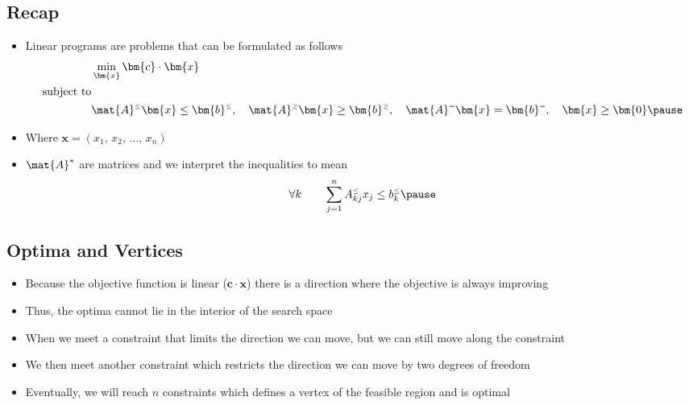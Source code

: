 \begin{slide}
\section{Recap}

\begin{PauseHighLight}
  \begin{itemize}
  \item Linear programs are problems that can be formulated as follows
    \begin{align*}
      &\min_{\bm{x}} \bm{c}\cdot \bm{x} \\
      \text{subject to}&\\
      &\mat{A}^{\scriptscriptstyle \leq} \bm{x} \leq
      \bm{b}^{\scriptscriptstyle \leq},  \quad
      \mat{A}^{\scriptscriptstyle \geq} 
      \bm{x} \geq \bm{b}^{\scriptscriptstyle \geq}, \quad 
      \mat{A}^{\scriptscriptstyle =} \bm{x} = \bm{b}^{\scriptscriptstyle
        =}, \quad \bm{x} \geq \bm{0}\pause 
    \end{align*}
  \item Where $\bm{x} = (x_1,\,x_2,\,\ldots,\,x_n)$\pause
  \item $\mat{A}^{*}$ are matrices and we interpret the inequalities to
    mean
    \begin{align*}
      \forall k \quad\quad \sum_{j=1}^n A_{kj}^{\scriptscriptstyle \leq}
      x_j \leq  b^{\scriptscriptstyle \leq}_k\pause
    \end{align*}
  \end{itemize}
\end{PauseHighLight}
\end{slide}


\begin{slide}
\section{Optima and Vertices}

\begin{PauseHighLight}
  \begin{itemize}
  \item Because the objective function is linear ($\bm{c}\cdot \bm{x}$)
    there is a direction where the objective is always improving\pause
  \item Thus, the optima cannot lie in the interior of the search space\pause
  \item When we meet a constraint that limits the direction we can move,
    but we can still move along the constraint\pause
  \item We then meet another constraint which restricts the direction we
    can move by two degrees of freedom\pause
  \item Eventually, we will reach $n$ constraints which defines a vertex
    of the feasible region and is optimal\pause
  \end{itemize}
\end{PauseHighLight}

\end{slide}



